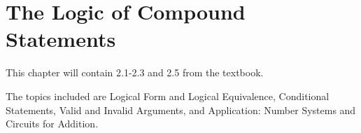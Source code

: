 \documentclass[../discrete.tex]{subfiles}
\begin{document}
\chapter{The Logic of Compound Statements}
This chapter will contain 2.1-2.3 and 2.5 from the textbook.

The topics included are Logical Form and Logical Equivalence, Conditional Statements, Valid and Invalid Arguments, and Application: Number Systems and Circuits for Addition. 
\end{document}
